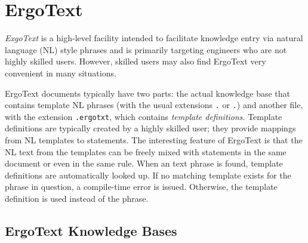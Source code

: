 
\section{ErgoText}\label{sec-ergotext}

\emph{ExgoText} is a high-level facility intended to facilitate knowledge
entry via natural language (NL) style phrases and is primarily targeting 
engineers who are not highly skilled \FLSYSTEM users.
However, skilled \FLSYSTEM users may also find ErgoText very convenient in
many situations.

ErgoText documents typically have two parts: the actual knowledge base that
contains template NL phrases (with the usual extensions
\texttt{.\ergoext} or \texttt{.\ergoext}) 
and another file, with the extension \texttt{.ergotxt},  which 
contains \emph{template definitions}.
Template definitions are typically created by a highly skilled \FLSYSTEM
user; they provide mappings from NL templates to \FLSYSTEM
statements. The interesting feature of ErgoText is that the NL text from
the templates
can be freely mixed with \FLSYSTEM statements in the same document or even
in the same rule. When an text phrase is found, template
definitions are automatically looked up. If no matching template exists for the
phrase in question, a compile-time error is issued. Otherwise, the
\FLSYSTEM template definition is used instead of the phrase.

\subsection{ErgoText Knowledge Bases}\label{sec-ergotext-kb}

